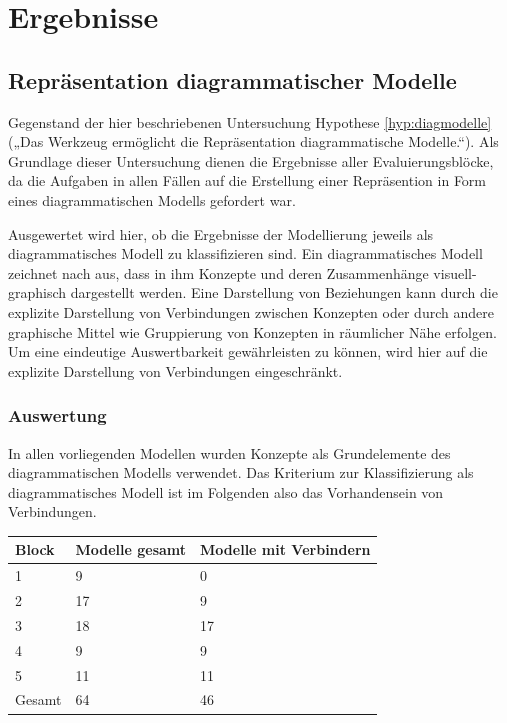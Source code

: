 
\section{Ergebnisse} %
\label{sec:ergebnisse}

\subsection{Repräsentation diagrammatischer Modelle} %
\label{sub:repräsentation_diagrammatischer_modelle}

Gegenstand der hier beschriebenen Untersuchung Hypothese \ref{hyp:diagmodelle} („Das Werkzeug ermöglicht die Repräsentation diagrammatische Modelle.“). Als Grundlage dieser Untersuchung dienen die Ergebnisse aller Evaluierungsblöcke, da die Aufgaben in allen Fällen auf die Erstellung einer Repräsention in Form eines diagrammatischen Modells gefordert war.

Ausgewertet wird hier, ob die Ergebnisse der Modellierung jeweils als diagrammatisches Modell zu klassifizieren sind. Ein diagrammatisches Modell zeichnet nach \citep{Larkin87} aus, dass in ihm Konzepte und deren Zusammenhänge visuell-graphisch dargestellt werden. Eine Darstellung von Beziehungen kann durch die explizite Darstellung von Verbindungen zwischen Konzepten oder durch andere graphische Mittel wie Gruppierung von Konzepten in räumlicher Nähe erfolgen. Um eine eindeutige Auswertbarkeit gewährleisten zu können, wird hier auf die explizite Darstellung von Verbindungen eingeschränkt. 

\subsubsection{Auswertung} %

In allen vorliegenden Modellen wurden Konzepte als Grundelemente des diagrammatischen Modells verwendet. Das Kriterium zur Klassifizierung als diagrammatisches Modell ist im Folgenden also das Vorhandensein von Verbindungen.

\begin{tabular}{| p{3cm} || p{3cm} | p{3cm} |}
  \hline
   Block & Modelle gesamt & Modelle mit Verbindern \\ \hline
   1 & 9 & 0 \\ 
   2 & 17 & 9 \\ 
   3 & 18 & 17 \\ 
   4 & 9 & 9 \\ 
   5 & 11 & 11 \\ \hline
   Gesamt & 64 & 46 \\ \hline
\end{tabular}

